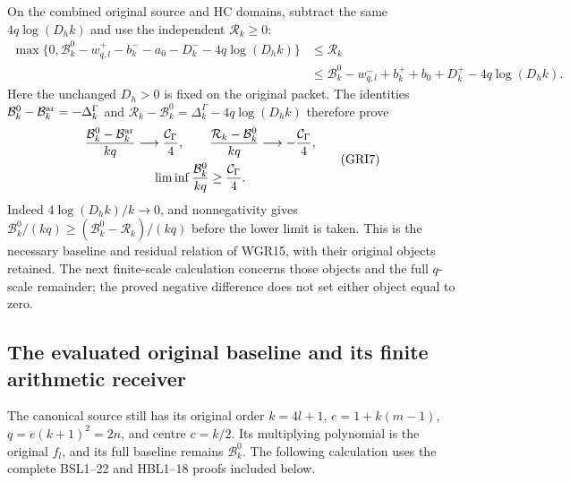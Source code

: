 \documentclass[11pt,a4paper]{article}
\begin{document}
On the combined original source and HC domains, subtract the
same $4q\log(D_hk)$ and use the independent $\mathcal R_k\geq0$:
\[
\begin{aligned}
 \max\{0,\mathcal B_k^0-w^+_{q,l}-b_k^--a_0-D_k^-
                                      -4q\log(D_hk)\}
 &\leq\mathcal R_k\\
 &\leq\mathcal B_k^0-w^-_{q,l}+b_k^++b_0+D_k^+
                                      -4q\log(D_hk).
\end{aligned}\tag{GRI6}
\]
Here the unchanged $D_h>0$ is fixed on the original packet.
The identities $\mathcal B_k^0-\mathcal B_k^{\rm ar}=-\Delta_k^\Gamma$
and $\mathcal R_k-\mathcal B_k^0=\Delta_k^\Gamma-4q\log(D_hk)$
therefore prove
\[
\begin{gathered}
 \frac{\mathcal B_k^0-\mathcal B_k^{\rm ar}}{kq}
                  \longrightarrow\frac{\mathcal C_\Gamma}{4},\qquad
 \frac{\mathcal R_k-\mathcal B_k^0}{kq}
                  \longrightarrow-\frac{\mathcal C_\Gamma}{4},\\
 \liminf\frac{\mathcal B_k^0}{kq}\geq\frac{\mathcal C_\Gamma}{4}.
\end{gathered}\tag{GRI7}
\]
Indeed $4\log(D_hk)/k\to0$, and nonnegativity gives
$\mathcal B_k^0/(kq)\geq(\mathcal B_k^0-\mathcal R_k)/(kq)$
before the lower limit is taken. This is the necessary
baseline and residual relation of WGR15, with their original
objects retained. The next finite-scale calculation concerns
those objects and the full $q$-scale remainder; the proved
negative difference does not set either object equal to zero.


\subsection{The evaluated original baseline and its finite arithmetic receiver}

The canonical source still has its original order $k=4l+1$,
$e=1+k(m-1)$, $q=e(k+1)^2=2n$, and centre $c=k/2$.
Its multiplying polynomial is the original $f_l$, and its full
baseline remains $\mathcal B_k^0$. The following calculation uses
the complete BSL1--22 and HBL1--18 proofs included below.
\end{document}
